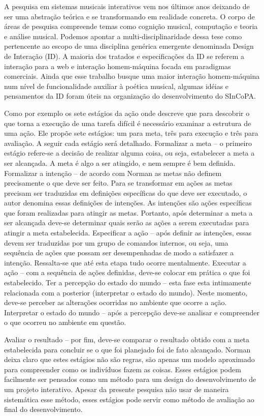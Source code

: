 \documentclass{ppgmus}
\begin{document}
A pesquisa em sistemas musicais interativos vem nos últimos anos
deixando de ser uma abstração teórica e se transformando em realidade
concreta. O corpo de áreas de pesquisa compreende temas como cognição
musical, computação e teoria e análise musical.
Podemos apontar a multi-disciplinaridade dessa tese como pertencente 
ao escopo de uma disciplina genérica emergente denominada Design de Interação (ID).
A maioria dos tratados e especificações da ID se referem a interação para a web
e interação homem-máquina focada em paradigmas comerciais. Ainda que esse trabalho busque
uma maior interação homem-máquina num nível de funcionalidade auxiliar à poética musical, algumas idéias e 
pensamentos da ID foram úteis na organização do desenvolvimento do SInCoPA. 

Como por exemplo os sete estágios da ação \cite{norman06:design} onde descreve que para 
descobrir o que torna a
execução de uma tarefa difícil é necessário examinar a
estrutura de uma ação. Ele propõe sete estágios: um para
meta, três para execução e três para avaliação. A seguir cada
estágio será detalhado.
Formalizar a meta – o primeiro estágio refere-se a decisão de
realizar alguma coisa, ou seja, estabelecer a meta a ser
alcançada. A meta é algo a ser atingido, e nem sempre é bem
definida.
Formalizar a intenção – de acordo com Norman as
metas não definem precisamente o que deve ser feito. Para
se transformar em ações as metas precisam ser traduzidas
em definições específicas do que deve ser executado, o autor
denomina essas definições de intenções. As intenções são
ações específicas que foram realizadas para atingir as metas.
Portanto, após determinar a meta a ser alcançada deve-se
determinar quais serão as ações a serem executadas para
atingir a meta estabelecida.
Especificar a ação – após definir as intenções, essas devem
ser traduzidas por um grupo de comandos internos, ou seja,
uma sequência de ações que possam ser desempenhadas de
modo a satisfazer a intenção. Ressalta-se que até esta etapa
tudo ocorre mentalmente.
Executar a ação – com a sequência de ações definidas,
deve-se colocar em prática o que foi estabelecido.
Ter a percepção do estado do mundo – esta fase esta
intimamente relacionada com a posterior (interpretar o estado
do mundo). Neste momento, deve-se perceber as alterações
ocorridas no ambiente que ocorre a ação.
Interpretar o estado do mundo – após a percepção deve-se
analisar e compreender o que ocorreu no ambiente em
questão.

Avaliar o resultado – por fim, deve-se comparar o resultado
obtido com a meta estabelecida para concluir se o que foi
planejado foi de fato alcançado.
Norman deixa claro que estes estágios não são regras,
são apenas um modelo aproximado para compreender como
os indivíduos fazem as coisas. Esses estágios podem facilmente
ser pensados como um método para um design do desenvolvimento 
de um projeto interativo. Apesar da presente pesquisa não usar de 
maneira sistemática esse método, esses estágios pode servir como
método de avaliação ao final do desenvolvimento.
\end{document}
